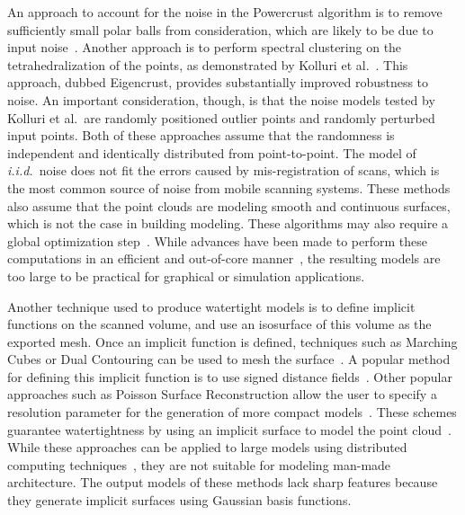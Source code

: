 \documentclass[12pt,onecolumn,oneside]{book}
\begin{document}
An approach to account for the noise in the Powercrust algorithm is to remove sufficiently small polar balls from consideration, which are likely to be due to input noise~\cite{NoisyPowercrust}.  Another approach is to perform spectral clustering on the tetrahedralization of the points, as demonstrated by Kolluri et al.~\cite{EigencrustShewchuk}.  This approach, dubbed Eigencrust, provides substantially improved robustness to noise.  An important consideration, though, is that the noise models tested by Kolluri et al.\ are randomly positioned outlier points and randomly perturbed input points.  Both of these approaches assume that the randomness is independent and identically distributed from point-to-point.  The model of {\it i.i.d.}\ noise does not fit the errors caused by mis-registration of scans, which is the most common source of noise from mobile scanning systems.  These methods also assume that the point clouds are modeling smooth and continuous surfaces, which is not the case in building modeling.  These algorithms may also require a global optimization step~\cite{EigencrustShewchuk}.  While advances have been made to perform these computations in an efficient and out-of-core manner~\cite{RealTimeEigenCrust,StreamingDelaunay}, the resulting models are too large to be practical for graphical or simulation applications.

Another technique used to produce watertight models is to define implicit functions on the scanned volume, and use an isosurface of this volume as the exported mesh.  Once an implicit function is defined, techniques such as Marching Cubes or Dual Contouring can be used to mesh the surface~\cite{MarchingCubes,DualContouring}. A popular method for defining this implicit function is to use signed distance fields~\cite{SignedDistanceFields}.  Other popular approaches such as Poisson Surface Reconstruction allow the user to specify a resolution parameter for the generation of more compact models~\cite{Poisson}.  These schemes guarantee watertightness by using an implicit surface to model the point cloud~\cite{UnorganizedPoints}.  While these approaches can be applied to large models using distributed computing techniques~\cite{OutOfCorePoisson,ParallelPoisson}, they are not suitable for modeling man-made architecture.  The output models of these methods lack sharp features because they generate implicit surfaces using Gaussian basis functions.  
\end{document}
